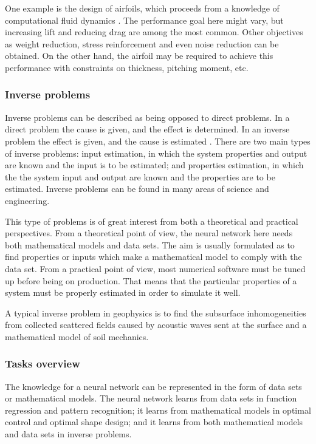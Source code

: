 One example is the design of airfoils,
which proceeds from a knowledge of computational fluid dynamics
\cite{Eyi1994} \cite{Mohammadi2004}. The performance goal here might
vary, but increasing lift and reducing drag are among the most common. Other objectives as weight reduction, stress reinforcement and
even noise reduction can be obtained. On the other hand, the airfoil
may be required to achieve this performance with constraints on
thickness, pitching moment, etc.

\subsubsection{Inverse problems}

Inverse problems can be described as being opposed to direct
problems. In a direct problem the cause is given, and the effect is
determined. In an inverse problem the effect is given, and the cause
is estimated \cite{Kirsch1996} \cite{Sabatier2000} \cite{Ramm2005}.
There are two main types of inverse problems: input estimation, in
which the system properties and output are known and the input is to
be estimated; and properties estimation, in which the the system
input and output are known and the properties are to be estimated.
Inverse problems can be found in many areas of science and
engineering. 

This type of problems is of great interest from both a theoretical and practical perspectives. 
From a theoretical point of view, the neural network here needs both mathematical models and data sets. 
The aim is usually formulated as to find properties or inputs which make a mathematical model to comply with the data set. 
From a practical point of view, most numerical software must be tuned up before being on production. 
That means that the particular properties of a system must be properly estimated in order to simulate it well.

A typical inverse problem in geophysics is to find the 
subsurface inhomogeneities from collected scattered fields caused by
acoustic waves sent at the surface and a mathematical model of soil mechanics.  

\subsubsection{Tasks overview}

The knowledge for a neural network can be represented in the form of data sets or mathematical models. 
The neural network learns from data sets in function regression and pattern recognition; 
it learns from mathematical models in optimal control and optimal shape design; 
and it learns from both mathematical models and data sets in inverse problems. 

